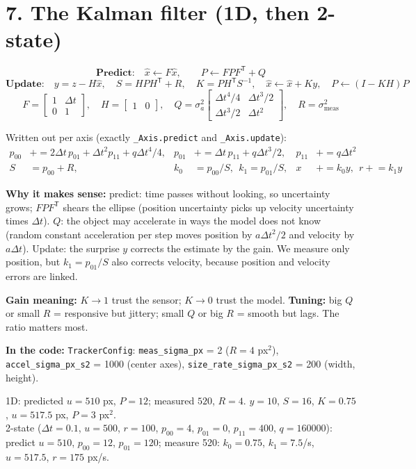 \documentclass[10pt]{article}
\newcommand{\code}[1]{\textcolor{code}{\texttt{#1}}}
\newcommand{\where}[1]{\par\textbf{\textcolor{code}{In the code:}} #1}
\newcommand{\why}[1]{\par\textbf{\textcolor{idea}{Why it makes sense:}} #1}
\begin{document}
\section*{7. The Kalman filter (1D, then 2-state)}
\begin{eqbox}
\[
\textbf{Predict:}\quad \hat x \leftarrow F\hat x,\qquad P \leftarrow F P F^{\mathsf T} + Q
\]
\[
\textbf{Update:}\quad y = z - H\hat x,\quad S = HPH^{\mathsf T} + R,\quad K = P H^{\mathsf T} S^{-1},\quad
\hat x \leftarrow \hat x + K y,\quad P \leftarrow (I - KH)P
\]
\[
F = \begin{bmatrix}1&\Delta t\\0&1\end{bmatrix},\quad H = \begin{bmatrix}1 & 0\end{bmatrix},\quad
Q = \sigma_a^2\begin{bmatrix}\Delta t^4/4 & \Delta t^3/2\\ \Delta t^3/2 & \Delta t^2\end{bmatrix},\quad
R = \sigma_\text{meas}^2
\]
\end{eqbox}
Written out per axis (exactly \code{\_Axis.predict} and \code{\_Axis.update}):
\[
\begin{aligned}
p_{00} &\mathrel{+}= 2\Delta t\,p_{01} + \Delta t^2 p_{11} + q\Delta t^4/4, &
p_{01} &\mathrel{+}= \Delta t\,p_{11} + q\Delta t^3/2, &
p_{11} &\mathrel{+}= q\Delta t^2\\
S &= p_{00} + R, & k_0 &= p_{00}/S,\ \ k_1 = p_{01}/S, & x &\mathrel{+}= k_0 y,\ \ r \mathrel{+}= k_1 y
\end{aligned}
\]
\why{predict: time passes without looking, so uncertainty grows; $F P F^{\mathsf T}$
shears the ellipse (position uncertainty picks up velocity uncertainty times $\Delta t$).
$Q$: the object may accelerate in ways the model does not know (random constant
acceleration per step moves position by $a\Delta t^2/2$ and velocity by $a\Delta t$).
Update: the surprise $y$ corrects the estimate by the gain. We measure only position, but
$k_1 = p_{01}/S$ also corrects velocity, because position and velocity errors are linked.}

\textbf{Gain meaning:} $K\to 1$ trust the sensor; $K \to 0$ trust the model.
\textbf{Tuning:} big $Q$ or small $R$ = responsive but jittery; small $Q$ or big $R$ =
smooth but lags. The ratio matters most.
\where{\code{TrackerConfig}: \code{meas\_sigma\_px} = 2 ($R = 4$ px$^2$),
\code{accel\_sigma\_px\_s2} = 1000 (center axes), \code{size\_rate\_sigma\_px\_s2} = 200
(width, height).}
\begin{exbox}
1D: predicted $u = 510$ px, $P = 12$; measured $520$, $R = 4$. $y = 10$, $S = 16$,
$K = 0.75$, $u = 517.5$ px, $P = 3$ px$^2$.\\
2-state ($\Delta t = 0.1$, $u=500$, $r=100$, $p_{00}=4$, $p_{01}=0$, $p_{11}=400$,
$q = 160000$): predict $u = 510$, $p_{00} = 12$, $p_{01} = 120$; measure 520:
$k_0 = 0.75$, $k_1 = 7.5$/s, $u = 517.5$, $r = 175$ px/s.
\end{exbox}
\end{document}

